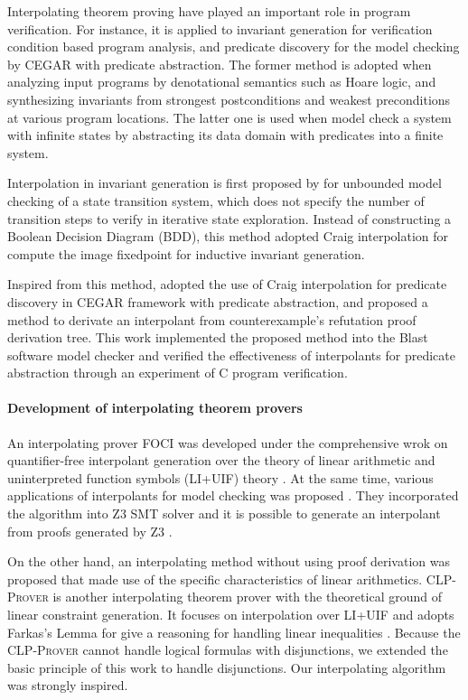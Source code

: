 Interpolating theorem proving have played an important role in program
verification.  For instance, it is applied to invariant generation for
verification condition based program analysis, and predicate discovery
for the model checking by CEGAR with predicate abstraction.  The
former method is adopted when analyzing input programs by denotational
semantics such as Hoare logic, and synthesizing invariants from
strongest postconditions and weakest preconditions at various program
locations.  The latter one is used when model check a system with
infinite states by abstracting its data domain with predicates into a
finite system.

Interpolation in invariant generation is first proposed
by \cite{conf/cav/McMillan03} for unbounded model checking of a state
transition system, which does not specify the number of transition
steps to verify in iterative state exploration.  Instead of
constructing a Boolean Decision Diagram (BDD), this method adopted
Craig interpolation for compute the image fixedpoint for inductive
invariant generation.

Inspired from this method, \cite{conf/popl/HenzingerJMM04} adopted the
use of Craig interpolation for predicate discovery in CEGAR framework
with predicate abstraction, and proposed a method to derivate an
interpolant from counterexample's refutation proof derivation tree.
This work implemented the proposed method into the Blast software
model checker \cite{conf/popl/HenzingerJMS02,journals/sttt/BeyerHJM07}
and verified the effectiveness of interpolants for predicate
abstraction through an experiment of C program verification.

\paragraph{Development of interpolating theorem provers}
An interpolating prover \textsc{FOCI} \cite{website/foci} was
developed under the comprehensive wrok on quantifier-free interpolant
generation over the theory of linear arithmetic and uninterpreted
function symbols (LI+UIF) theory \cite{journals/tcs/McMillan05}.  At the same
time, various applications of interpolants for model checking was
proposed \cite{conf/tacas/McMillan05}. They incorporated the algorithm
into Z3 SMT solver \cite{conf/tacas/MouraB08} and it is possible to
generate an interpolant from proofs generated by
Z3 \cite{conf/fmcad/McMillan11}.


On the other hand, an interpolating method without using proof
derivation was proposed that made use of the specific characteristics
of linear arithmetics.  \textsc{CLP-Prover} \cite{website/clp} is
another interpolating theorem prover with the theoretical ground of
linear constraint generation.  It focuses on interpolation over LI+UIF
and adopts Farkas's Lemma \cite{journals/networks/Rajan90} for give a
reasoning for handling linear
inequalities \cite{conf/vmcai/RybalchenkoS07, conf/cav/Rybalchenko10}.
Because the \textsc{CLP-Prover} cannot handle logical formulas with
disjunctions, we extended the basic principle of this work to handle
disjunctions. Our interpolating algorithm was strongly inspired.

